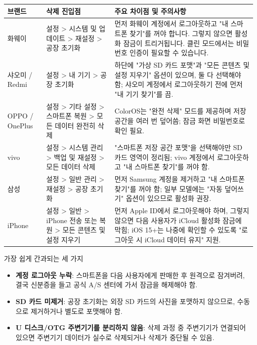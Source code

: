 \begin{center}
\begin{tabularx}{\linewidth}{|X|X|X|}
\hline
\textbf{브랜드} & \textbf{삭제 진입점} & \textbf{주요 차이점 및 주의사항} \tabularnewline
\hline
화웨이 & 설정 > 시스템 및 업데이트 > 재설정 > 공장 초기화 & 먼저 화웨이 계정에서 로그아웃하고 "내 스마트폰 찾기"를 꺼야 합니다. 그렇지 않으면 활성화 잠금이 트리거됩니다. 클린 모드에서는 비밀번호 인증이 필요할 수 있습니다. \tabularnewline
샤오미 / Redmi & 설정 > 내 기기 > 공장 초기화 & 하단에 "가상 SD 카드 포맷"과 "모든 콘텐츠 및 설정 지우기" 옵션이 있으며, 둘 다 선택해야 함; 샤오미 계정에서 로그아웃하기 전에 먼저 "내 기기 찾기"를 끔. \tabularnewline
OPPO / OnePlus & 설정 > 기타 설정 > 스마트폰 복원 > 모든 데이터 완전히 삭제 & ColorOS는 "완전 삭제" 모드를 제공하며 저장 공간을 여러 번 덮어씀; 잠금 화면 비밀번호로 확인 필요. \tabularnewline
vivo & 설정 > 시스템 관리 > 백업 및 재설정 > 모든 데이터 삭제 & "스마트폰 저장 공간 포맷"을 선택해야만 SD 카드 영역이 정리됨; vivo 계정에서 로그아웃하고 "내 스마트폰 찾기"를 꺼야 함. \tabularnewline
삼성 & 설정 > 일반 관리 > 재설정 > 공장 초기화 & 먼저 Samsung 계정을 제거하고 "내 스마트폰 찾기"를 꺼야 함; 일부 모델에는 "자동 덮어쓰기" 옵션이 있으므로 활성화 권장. \tabularnewline
iPhone & 설정 > 일반 > iPhone 전송 또는 복원 > 모든 콘텐츠 및 설정 지우기 & 먼저 Apple ID에서 로그아웃해야 하며, 그렇지 않으면 다음 사용자가 iCloud 활성화 잠금에 막힘; iOS 15+는 나중에 확인할 수 있도록 "로그아웃 시 iCloud 데이터 유지" 지원. \tabularnewline
\hline
\end{tabularx}
\end{center}

\begin{tcbwarn}{가장 쉽게 간과되는 세 가지}
\begin{itemize}
  \item \textbf{계정 로그아웃 누락}: 스마트폰을 다음 사용자에게 판매한 후 원격으로 잠겨버려, 결국 신분증을 들고 공식 A/S 센터에 가서 잠금을 해제해야 함.
  \item \textbf{SD 카드 미제거}: 공장 초기화는 외장 SD 카드의 사진을 포맷하지 않으므로, 수동으로 제거하거나 별도로 포맷해야 함.
  \item \textbf{U 디스크/OTG 주변기기를 분리하지 않음}: 삭제 과정 중 주변기기가 연결되어 있으면 주변기기 데이터가 실수로 삭제되거나 삭제가 중단될 수 있음.
\end{itemize}

\end{tcbwarn}


